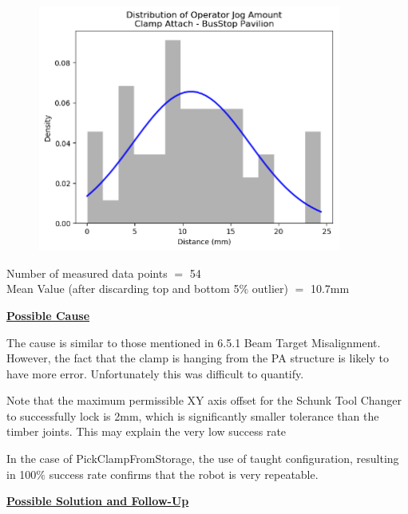 \documentclass[11pt]{book}
\begin{document}
{\footnotesize \begin{figure}[H]
\includegraphics[width=10.0cm,height=8.1cm]{./images/image74.png}
\end{figure}
}

{\footnotesize Number of measured data points $=$ 54 \\ Mean Value (after discarding top and bottom 5$\%$ outlier) $=$ 10.7mm}

\textbf{\uline{Possible Cause}}

The cause is similar to those mentioned in 6.5.1 Beam Target Misalignment. However, the fact that the clamp is hanging from the PA structure is likely to have more error. Unfortunately this was difficult to quantify. 

Note that the maximum permissible XY axis offset for the Schunk Tool Changer to successfully lock is 2mm, which is significantly smaller tolerance than the timber joints. This may explain the very low success rate

In the case of PickClampFromStorage, the use of taught configuration, resulting in 100$\%$ success rate confirms that the robot is very repeatable. 

\textbf{\uline{Possible Solution and Follow-Up}}
\end{document}
